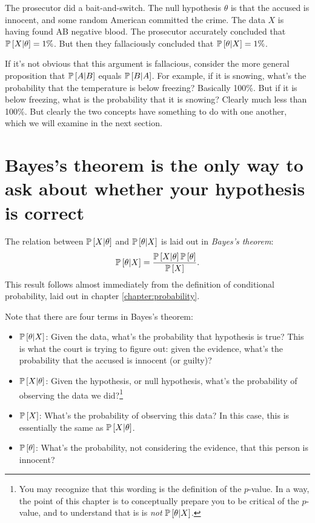 The prosecutor did a bait-and-switch. The null hypothesis $\theta$ is that the accused is innocent, and some random American committed the crime. The data $X$ is having found AB negative blood. The prosecutor accurately concluded that $\mathbb{P}\left[{X | \theta}\right] = 1\%$. But then they fallaciously concluded that $\mathbb{P}\left[{\theta | X}\right] = 1\%$.

If it's not obvious that this argument is fallacious, consider the more general proposition that $\mathbb{P}\left[{A | B}\right]$ equals $\mathbb{P}\left[{B | A}\right]$. For example, if it is snowing, what's the probability that the temperature is below freezing? Basically 100\%. But if it is below freezing, what is the probability that it is snowing? Clearly much less than 100\%. But clearly the two concepts have something to do with one another, which we will examine in the next section.

\section{Bayes's theorem is the only way to ask about whether your hypothesis is correct}

The relation between $\mathbb{P}\left[{X | \theta}\right]$ and $\mathbb{P}\left[{\theta | X}\right]$ is laid out in \emph{Bayes's theorem}:
\begin{equation}
\mathbb{P}\left[{\theta | X}\right] = \frac{\mathbb{P}\left[{X | \theta}\right] \mathbb{P}\left[{\theta}\right]}{\mathbb{P}\left[{X}\right]}.
\end{equation}
This result follows almost immediately from the definition of conditional probability, laid out in chapter \ref{chapter:probability}.

Note that there are four terms in Bayes's theorem:
\begin{itemize}
\item $\mathbb{P}\left[{\theta | X}\right]$: Given the data, what's the probability that hypothesis is true? This is what the court is trying to figure out: given the evidence, what's the probability that the accused is innocent (or guilty)?
\item $\mathbb{P}\left[{X | \theta}\right]$: Given the hypothesis, or null hypothesis, what's the probability of observing the data we did?\footnote{You may recognize that this wording is the definition of the $p$-value. In a way, the point of this chapter is to conceptually prepare you to be critical of the $p$-value, and to understand that is is \emph{not} $\mathbb{P}\left[{\theta | X}\right]$.}
\item $\mathbb{P}\left[{X}\right]$: What's the probability of observing this data? In this case, this is essentially the same as $\mathbb{P}\left[{X | \theta}\right]$.
\item $\mathbb{P}\left[{\theta}\right]$: What's the probability, not considering the evidence, that this person is innocent?
\end{itemize}

